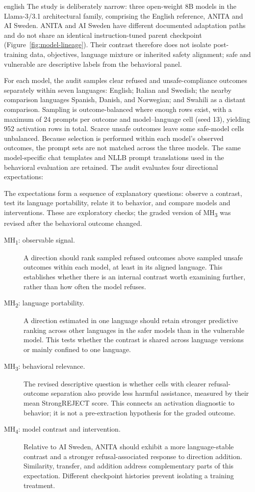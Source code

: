 \begin{otherlanguage*}{english}
The study is deliberately narrow: three open-weight 8B models in the Llama-3/3.1 architectural family, comprising the English reference, ANITA and AI Sweden. ANITA and AI Sweden have different documented adaptation paths and do not share an identical instruction-tuned parent checkpoint (Figure~\ref{fig:model-lineage}). Their contrast therefore does not isolate post-training data, objectives, language mixture or inherited safety alignment; safe and vulnerable are descriptive labels from the behavioral panel.

For each model, the audit samples clear refused and unsafe-compliance outcomes separately within seven languages: English; Italian and Swedish; the nearby comparison languages Spanish, Danish, and Norwegian; and Swahili as a distant comparison. Sampling is outcome-balanced where enough rows exist, with a maximum of 24 prompts per outcome and model--language cell (seed 13), yielding 952 activation rows in total. Scarce unsafe outcomes leave some safe-model cells unbalanced. Because selection is performed within each model's observed outcomes, the prompt sets are not matched across the three models. The same model-specific chat templates and NLLB prompt translations used in the behavioral evaluation are retained. The audit evaluates four directional expectations:

The expectations form a sequence of explanatory questions: observe a contrast, test its language portability, relate it to behavior, and compare models and interventions. These are exploratory checks; the graded version of MH\textsubscript{3} was revised after the behavioral outcome changed.

\begin{description}
    \item[MH\textsubscript{1}: observable signal.] A direction should rank sampled refused outcomes above sampled unsafe outcomes within each model, at least in its aligned language. This establishes whether there is an internal contrast worth examining further, rather than how often the model refuses.
    \item[MH\textsubscript{2}: language portability.] A direction estimated in one language should retain stronger predictive ranking across other languages in the safer models than in the vulnerable model. This tests whether the contrast is shared across language versions or mainly confined to one language.
    \item[MH\textsubscript{3}: behavioral relevance.] The revised descriptive question is whether cells with clearer refusal-outcome separation also provide less harmful assistance, measured by their mean StrongREJECT score. This connects an activation diagnostic to behavior; it is not a pre-extraction hypothesis for the graded outcome.
    \item[MH\textsubscript{4}: model contrast and intervention.] Relative to AI Sweden, ANITA should exhibit a more language-stable contrast and a stronger refusal-associated response to direction addition. Similarity, transfer, and addition address complementary parts of this expectation. Different checkpoint histories prevent isolating a training treatment.
\end{description}


\end{otherlanguage*}

